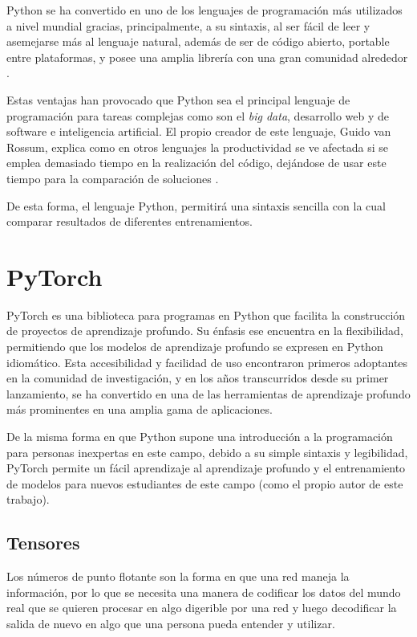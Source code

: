 \documentclass{report}
\begin{document}
Python se ha convertido en uno de los lenguajes de programación más utilizados a nivel mundial gracias, principalmente, a su sintaxis, al ser fácil de leer y asemejarse más al lenguaje natural, además de ser de código abierto, portable entre plataformas, y posee una amplia librería con una gran comunidad alrededor \cite{ArticuloPythonGithub}.

Estas ventajas han provocado que Python sea el principal lenguaje de programación para tareas complejas como son el \textit{big data}, desarrollo web y de software e inteligencia artificial. El propio creador de este lenguaje, Guido van Rossum, explica como en otros lenguajes la productividad se ve afectada si se emplea demasiado tiempo en la realización del código, dejándose de usar este tiempo para la comparación de soluciones \cite{LexFridmanGuidoVanRossum}.

De esta forma, el lenguaje Python, permitirá una sintaxis sencilla con la cual comparar resultados de diferentes entrenamientos.



\section{PyTorch}

PyTorch es una biblioteca para programas en Python que facilita la construcción de proyectos de aprendizaje profundo. Su énfasis ese encuentra en la flexibilidad, permitiendo que los modelos de aprendizaje profundo se expresen en Python idiomático. Esta accesibilidad y facilidad de uso encontraron primeros adoptantes en la comunidad de investigación, y en los años transcurridos desde su primer lanzamiento, se ha convertido en una de las herramientas de aprendizaje profundo más prominentes en una amplia gama de aplicaciones.

De la misma forma en que Python supone una introducción a la programación para personas inexpertas en este campo, debido a su simple sintaxis y legibilidad, PyTorch permite un fácil aprendizaje al aprendizaje profundo y el entrenamiento de
modelos para nuevos estudiantes de este campo (como el propio autor de este trabajo). \cite{DeepLearningPytorchBook}

\subsection{Tensores}

Los números de punto flotante son la forma en que una red maneja la información, por lo que se necesita una manera de codificar los datos del mundo real que se quieren procesar en algo digerible por una red y luego decodificar la salida de nuevo en algo que una persona pueda entender y utilizar. 
\end{document}
